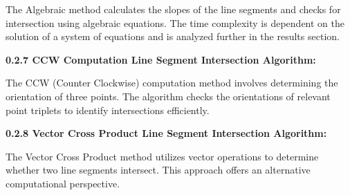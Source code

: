 The Algebraic method calculates the slopes of the line segments and checks for intersection using algebraic equations.
The time complexity is dependent on the solution of a system of equations and is analyzed further in the results section.

\textbf{0.2.7 CCW Computation Line Segment Intersection Algorithm:}

The CCW (Counter Clockwise) computation method involves determining the orientation of three points. The algorithm checks the orientations of relevant point triplets to identify intersections efficiently.

\textbf{0.2.8 Vector Cross Product Line Segment Intersection Algorithm:}

The Vector Cross Product method utilizes vector operations to determine whether two line segments intersect. This
approach offers an alternative computational perspective.